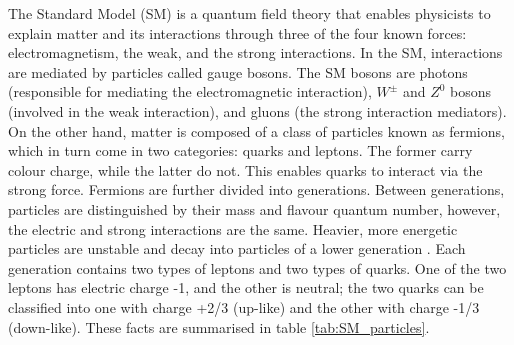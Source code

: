 The Standard Model (SM) is a quantum field theory that enables physicists to explain matter and its interactions through three of the four known forces: electromagnetism, the weak, and the strong interactions. In the SM, interactions are mediated by particles called gauge bosons. The SM bosons are photons (responsible for mediating the electromagnetic interaction), $W^{\pm}$ and $Z^0$ bosons (involved in the weak interaction), and gluons (the strong interaction mediators). On the other hand, matter is composed of a class of particles known as fermions, which in turn come in two categories: quarks and leptons. The former carry colour charge, while the latter do not. This enables quarks to interact via the strong force. Fermions are further divided into generations. Between generations, particles are distinguished by their mass and flavour quantum number, however, the electric and strong interactions are the same. Heavier, more energetic particles are unstable and decay into particles of a lower generation \cite{kane_modern_1987}. Each generation contains two types of leptons and two types of quarks. One of the two leptons has electric charge -1, and the other is neutral; the two quarks can be classified into one with charge +2/3 (up-like) and the other with charge -1/3 (down-like). These facts are summarised in table \ref{tab:SM_particles}.

